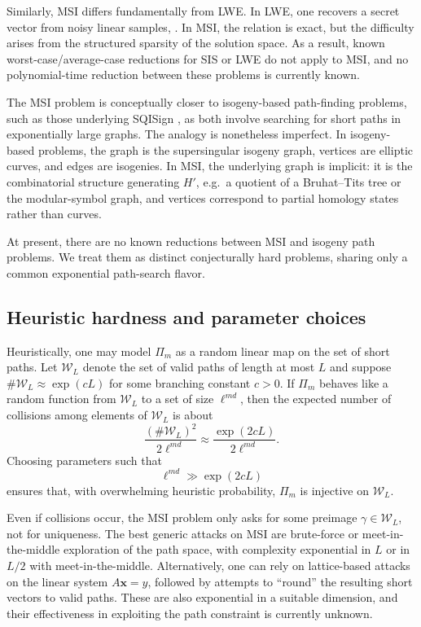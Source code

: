 \documentclass[10pt]{amsart}
\theoremstyle{theostyle}
\begin{document}
Similarly, MSI differs fundamentally from LWE. In LWE, one recovers a secret
vector from noisy linear samples, \cite{Regev:LWE}. In MSI, the relation is exact, but the
difficulty arises from the structured sparsity of the solution space.
As a result, known worst-case/average-case reductions for SIS or LWE do not
apply to MSI, and no polynomial-time reduction between these problems is
currently known.

The MSI problem is conceptually closer to isogeny-based path-finding problems,
such as those underlying SQISign \cite{SQISign,CGL:Hash}, as both involve searching for short
paths in exponentially large graphs.
The analogy is nonetheless imperfect. In isogeny-based problems, the graph is
the supersingular isogeny graph, vertices are elliptic curves, and edges are isogenies. In MSI, the underlying graph is implicit:
it is the combinatorial structure generating $H'$, e.g.\ a quotient of a
Bruhat--Tits tree or the modular-symbol graph, and vertices correspond to
partial homology states rather than curves.

At present, there are no known reductions between MSI and isogeny path
problems. We treat them as distinct conjecturally hard problems, sharing only
a common exponential path-search flavor.

\subsection{Heuristic hardness and parameter choices}

Heuristically, one may model $\Pi_m$ as a random linear map on the set of
short paths. Let $\mathcal W_L$ denote the set of valid paths of length at
most $L$ and suppose $\#\mathcal W_L \approx \exp(cL)$ for some branching
constant $c>0$. If $\Pi_m$ behaves like a random function from $\mathcal W_L$
to a set of size $\ell^{md}$, then the expected number of collisions among
elements of $\mathcal W_L$ is about
\[
\frac{(\#\mathcal W_L)^2}{2\ell^{md}} \approx
\frac{\exp(2cL)}{2\ell^{md}}.
\]
Choosing parameters such that
\[
\ell^{md} \gg \exp(2cL)
\]
ensures that, with overwhelming heuristic probability, $\Pi_m$ is injective
on $\mathcal W_L$.

Even if collisions occur, the MSI problem only asks for some preimage
$\gamma\in\mathcal W_L$, not for uniqueness. The best generic attacks
on MSI are brute-force or meet-in-the-middle exploration of the path space,
	with complexity exponential in $L$ or in $L/2$ with meet-in-the-middle.
Alternatively, one can rely on lattice-based attacks on the linear system $A\mathbf x=y$, followed
	by attempts to ``round'' the resulting short vectors to valid paths.
	These are also exponential in a suitable dimension, and their effectiveness
	in exploiting the path constraint is currently unknown.
\end{document}
